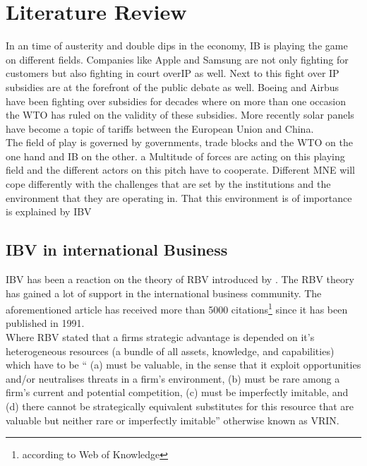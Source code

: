 \chapter{Literature Review}


In an time of austerity and double dips in the economy, \gls{IB} is playing the game on different fields. Companies like Apple and Samsung are not only fighting for customers but also fighting in court over\gls{IP} as well. Next to this fight over \gls{IP} subsidies are at the forefront of the public debate as well. Boeing and Airbus have been fighting over subsidies for decades where on more than one occasion the \gls{WTO} has ruled on the validity of these subsidies. More recently solar panels have become a topic of tariffs between the European Union and China. \\
The field of play is governed by governments, trade blocks and the \gls{WTO} on the one hand and \gls{IB} on the other. a Multitude of forces are acting on this playing field and the different actors on this pitch have to cooperate. Different \gls{MNE} will cope differently with the challenges that are set by the institutions and the environment that they are operating in. That this environment is of importance is explained by \gls{IBV}~\cite{Kostova:1999,Meyer:2009,Wang:2012} 

\section{\glsdesc{IBV} in international Business}

\gls{IBV} has been a reaction on the theory of \gls{RBV} introduced by  \cite{Barney:1991}. The \gls{RBV} theory has gained a lot of support in the international business community. The aforementioned article has received more than 5000 citations\footnote{according to Web of Knowledge %
} since it has been published in 1991.\\ Where \gls{RBV} stated that a firms strategic advantage is depended on it's heterogeneous resources (a bundle of all assets, knowledge, and capabilities) which have to be ``
(a) must be valuable, in the sense that it exploit opportunities and/or neutralises threats in a firm’s environment, (b) must be rare among a firm’s current and potential competition, (c) must be imperfectly imitable, and (d) there cannot be strategically equivalent substitutes for this resource that are valuable but neither rare or imperfectly imitable'' \cite{Barney:1991} otherwise known as VRIN.

